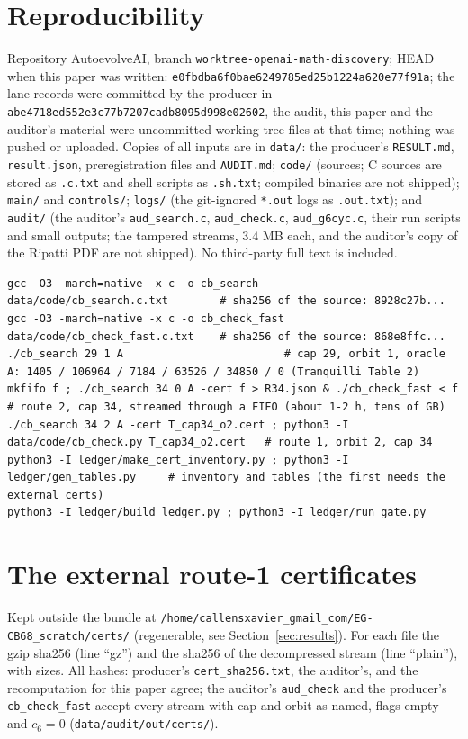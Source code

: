 \documentclass[10pt]{article}
\begin{document}
\section{Reproducibility}\label{sec:repro}
Repository AutoevolveAI, branch \texttt{worktree-openai-math-discovery}; HEAD when this paper was written: \texttt{e0fbdba6f0bae6249785ed25b1224a620e77f91a}; the lane records were committed by the producer in \texttt{abe4718ed552e3c77b7207cadb8095d998e02602}, the audit, this paper and the auditor's material were uncommitted working-tree files at that time; nothing was pushed or uploaded. Copies of all inputs are in \texttt{data/}: the producer's \texttt{RESULT.md}, \texttt{result.json}, preregistration files and \texttt{AUDIT.md}; \texttt{code/} (sources; C sources are stored as \texttt{.c.txt} and shell scripts as \texttt{.sh.txt}; compiled binaries are not shipped); \texttt{main/} and \texttt{controls/}; \texttt{logs/} (the git-ignored \texttt{*.out} logs as \texttt{.out.txt}); and \texttt{audit/} (the auditor's \texttt{aud\_search.c}, \texttt{aud\_check.c}, \texttt{aud\_g6cyc.c}, their run scripts and small outputs; the tampered streams, $3.4$ MB each, and the auditor's copy of the Ripatti PDF are not shipped). No third-party full text is included.
\begin{lstlisting}[basicstyle=\ttfamily\scriptsize]
gcc -O3 -march=native -x c -o cb_search       data/code/cb_search.c.txt        # sha256 of the source: 8928c27b...
gcc -O3 -march=native -x c -o cb_check_fast   data/code/cb_check_fast.c.txt    # sha256 of the source: 868e8ffc...
./cb_search 29 1 A                         # cap 29, orbit 1, oracle A: 1405 / 106964 / 7184 / 63526 / 34850 / 0 (Tranquilli Table 2)
mkfifo f ; ./cb_search 34 0 A -cert f > R34.json & ./cb_check_fast < f     # route 2, cap 34, streamed through a FIFO (about 1-2 h, tens of GB)
./cb_search 34 2 A -cert T_cap34_o2.cert ; python3 -I data/code/cb_check.py T_cap34_o2.cert   # route 1, orbit 2, cap 34
python3 -I ledger/make_cert_inventory.py ; python3 -I ledger/gen_tables.py     # inventory and tables (the first needs the external certs)
python3 -I ledger/build_ledger.py ; python3 -I ledger/run_gate.py
\end{lstlisting}

\appendix
\section{The external route-1 certificates}\label{sec:certs}
Kept outside the bundle at \texttt{/home/callensxavier\_gmail\_com/EG-CB68\_scratch/certs/} (regenerable, see Section~\ref{sec:results}). For each file the gzip sha256 (line ``gz'') and the sha256 of the decompressed stream (line ``plain''), with sizes. All hashes: producer's \texttt{cert\_sha256.txt}, the auditor's, and the recomputation for this paper agree; the auditor's \texttt{aud\_check} and the producer's \texttt{cb\_check\_fast} accept every stream with cap and orbit as named, flags empty and $c_6=0$ (\texttt{data/audit/out/certs/}).
{\scriptsize\setlength{\tabcolsep}{3pt}}
\end{document}
